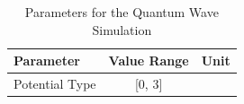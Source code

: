 \begin{table}[h]
\centering
\begin{tabular}{|l|c|r|}
\hline
Parameter & Value Range & Unit \\
\hline
Potential Type & [0, 3] &  \\
\hline
\end{tabular}
\caption{Parameters for the Quantum Wave Simulation}
\end{table}
